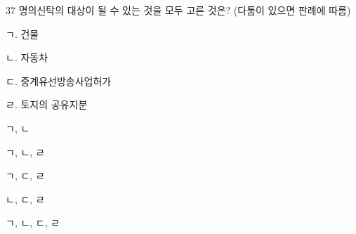 \begin{question}{37}
명의신탁의 대상이 될 수 있는 것을 모두 고른 것은? (다툼이 있으면 판례에 따름)
\begin{framedtext}
ㄱ. 건물 \par
ㄴ. 자동차 \par
ㄷ. 중계유선방송사업허가 \par
ㄹ. 토지의 공유지분 \par
\end{framedtext}
\begin{choices}
  \item ㄱ, ㄴ
  \item ㄱ, ㄴ, ㄹ
  \item ㄱ, ㄷ, ㄹ
  \item ㄴ, ㄷ, ㄹ
  \item ㄱ, ㄴ, ㄷ, ㄹ
\end{choices}
\end{question}
